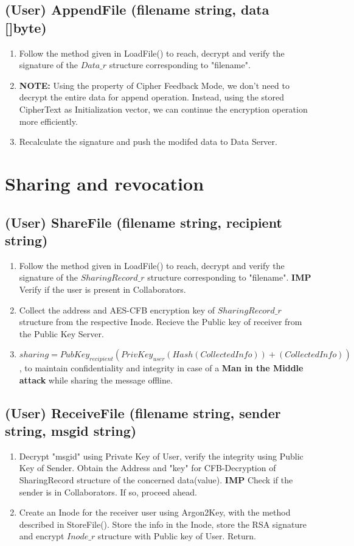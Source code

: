 \documentclass[a4paper, 12pt]{scrartcl}
\begin{document}
\subsection{(User) AppendFile (filename string, data []byte)}
\begin{enumerate}
	\itemsep0em
	\item Follow the method given in LoadFile() to reach, decrypt and verify the signature of the $Data\_r$ structure corresponding to "filename". 
	\item \textbf{NOTE:} Using the property of Cipher Feedback Mode, we don't need to decrypt the entire data for append operation. Instead, using the stored CipherText as Initialization vector, we can continue the encryption operation more efficiently.
	\item Recalculate the signature and push the modifed data to Data Server.
\end{enumerate}

\section{Sharing and revocation}

\subsection{(User) ShareFile (filename string, recipient string)}
\begin{enumerate}
	\itemsep0em
	\item Follow the method given in LoadFile() to reach, decrypt and verify the signature of the $SharingRecord\_r$ structure corresponding to "filename". \textbf{IMP} Verify if the user is present in Collaborators.
	\item Collect the address and AES-CFB encryption key of $SharingRecord\_r$ structure from the respective Inode. Recieve the Public key of receiver from the Public Key Server.
	\item $sharing = PubKey_{recipient}(PrivKey_{user}(Hash(Collected Info)) + (Collected Info))$, to maintain confidentiality and integrity in case of a \textbf{Man in the Middle attack} while sharing the message offline.
\end{enumerate}

\subsection{(User) ReceiveFile (filename string, sender string, msgid string)}
\begin{enumerate}
	\itemsep0em
	\item Decrypt "msgid" using Private Key of User, verify the integrity using Public Key of Sender. Obtain the Address and "key" for CFB-Decryption of SharingRecord structure of the concerned data(value). \textbf{IMP} Check if the sender is in Collaborators. If so, proceed ahead.
	\item Create an Inode for the receiver user using Argon2Key, with the method described in StoreFile(). Store the info in the Inode, store the RSA signature and encrypt $Inode\_r$ structure with Public key of User. Return.
\end{enumerate}
\end{document}
